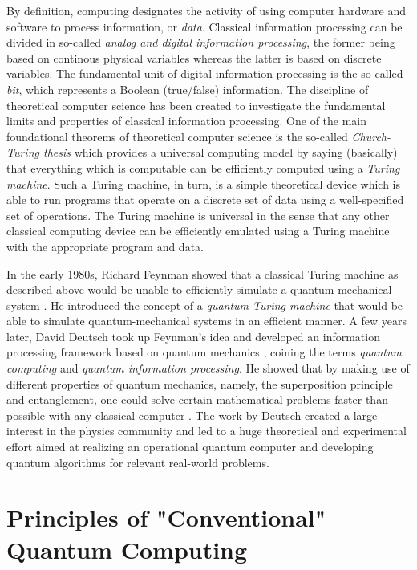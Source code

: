 By definition, computing designates the activity of using computer hardware and software to process information, or {\it data}. Classical information processing can be divided in so-called {\it analog and digital information processing}, the former being based on continous physical variables whereas the latter is based on discrete variables. The fundamental unit of digital information processing is the so-called {\it bit}, which represents a Boolean (true/false) information. The discipline of theoretical computer science has been created to investigate the fundamental limits and properties of classical information processing. One of the main foundational theorems of theoretical computer science is the so-called {\it Church-Turing thesis} which provides a universal computing model by saying (basically) that everything which is computable can be efficiently computed using a {\it Turing machine}. Such a Turing machine, in turn, is a simple theoretical device which is able to run programs that operate on a discrete set of data using a well-specified set of operations. The Turing machine is universal in the sense that any other classical computing device can be efficiently emulated using a Turing machine with the appropriate program and data.

\smallskip

In the early 1980s, Richard Feynman showed that a classical Turing machine as described above would be unable to efficiently simulate a quantum-mechanical system \citep{feynman_simulating_1982}. He introduced the concept of a {\it quantum Turing machine} that would be able to simulate quantum-mechanical systems in an efficient manner. A few years later, David Deutsch took up Feynman's idea and developed an information processing framework based on quantum mechanics \citep{deutsch_quantum_1985}, coining the terms {\it quantum computing} and {\it quantum information processing}. He showed that by making use of different properties of quantum mechanics, namely, the superposition principle and entanglement, one could solve certain mathematical problems faster than possible with any classical computer \citep{deutsch_quantum_1985}. The work by Deutsch created a large interest in the physics community and led to a huge theoretical and experimental effort aimed at realizing an operational quantum computer and developing quantum algorithms for relevant real-world problems.

\section{Principles of "Conventional" Quantum Computing}

